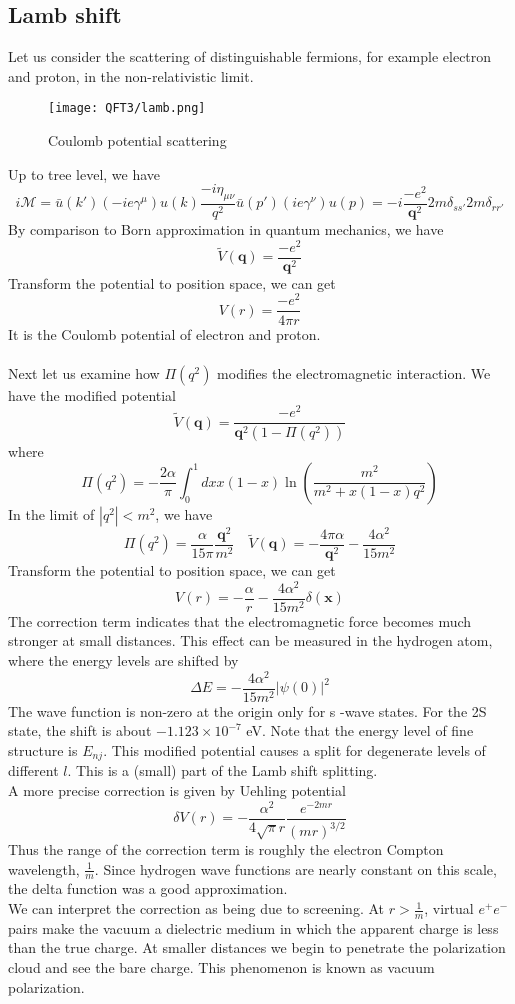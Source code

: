 \subsection{Lamb shift}
Let us consider the scattering of distinguishable fermions, for example electron and proton, in the non-relativistic limit. 

\begin{figure}[!h]
\centering
\texttt{[image: QFT3/lamb.png]}
\caption{Coulomb potential scattering} 
\end{figure}

\noindent
Up to tree level, we have
\[i\mathcal{M} = \bar{u}(k')(-ie\gamma^{\mu})u(k) \frac{-i\eta_{\mu\nu}}{q^2} \bar{u}(p')(ie\gamma^{\nu})u(p) = -i \frac{-e^2}{\bm{q}^2} 2m \delta_{ss'} 2m\delta_{rr'}\]
By comparison to Born approximation in quantum mechanics, we have
\[\tilde{V}(\bm{q}) = \frac{-e^2}{\bm{q}^2}\]
Transform the potential to position space, we can get
\[V(r) = \frac{-e^2}{4\pi r}\]
It is the Coulomb potential of electron and proton.
\\ \\
Next let us examine how $\Pi(q^2)$ modifies the electromagnetic interaction. We have the modified potential
\[\tilde{V}(\bm{q}) = \frac{-e^2}{\bm{q}^2(1-\Pi(q^2))}\]
where
\[\Pi(q^2) = -\frac{2\alpha}{\pi} \int_0^1 dx x(1-x) \ln \left( \frac{m^2}{m^2 + x(1-x)q^2} \right)\]
In the limit of $|q^2|<m^2$, we have
\[\Pi(q^2) = \frac{\alpha}{15\pi}\frac{\bm{q}^2}{m^2} \quad \tilde{V}(\bm{q}) = -\frac{4\pi\alpha}{\bm{q}^2} - \frac{4\alpha^2}{15m^2}\]
Transform the potential to position space, we can get
\[V(r) = -\frac{\alpha}{r} - \frac{4\alpha^2}{15m^2} \delta(\bm{x})\]
The correction term indicates that the electromagnetic force becomes much stronger at small distances. This effect can be measured in the hydrogen atom, where the energy levels are shifted by
\[\Delta E = - \frac{4\alpha^2}{15m^2} |\psi(0)|^2\]
The wave function is non-zero at the origin only for s -wave states. For the 2S state, the shift is about $-1.123 \times 10^{-7}$ eV. Note that the energy level of fine structure is $E_{nj}$. This modified potential causes a split for degenerate levels of different $l$. This is a (small) part of the Lamb shift splitting. \\
A more precise correction is given by Uehling potential
\[\delta V(r) = -\frac{\alpha^2}{4\sqrt{\pi}r} \frac{e^{-2mr}}{(mr)^{3/2}}\]
Thus the range of the correction term is roughly the electron Compton wavelength, $\frac{1}{m}$. 
Since hydrogen wave functions are nearly constant on this scale, the delta function was a good approximation.\\
We can interpret the correction as being due to screening. At $r > \frac{1}{m}$, virtual $e^+e^-$ pairs make the vacuum a dielectric medium in which the apparent charge is less than the true charge. 
At smaller distances we begin to penetrate the polarization cloud and see the bare charge. This phenomenon is known as vacuum polarization.